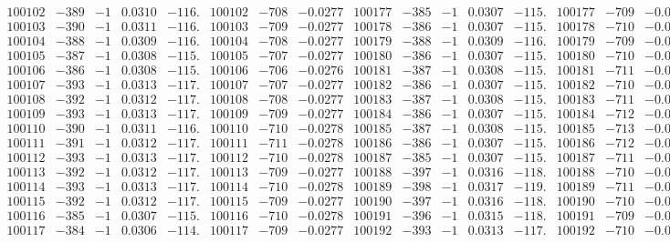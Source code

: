 \documentclass[11pt,reqno,a4letter]{article}
\numberwithin{figure}{section}
\numberwithin{table}{section}
\theoremstyle{plain}
\numberwithin{theorem}{section}
\theoremstyle{definition}
\begin{document}
\begin{table}[ht!]
\begin{equation*}
{\begin{array}{ccccc|ccc||ccccc|ccc}
100102 & -389 & -1 & 0.0310 & -116. & 100102 & -708 & -0.0277 & 100177 & -385 & -1 & 0.0307 & -115. & 100177 & -709 & -0.0277  \\
100103 & -390 & -1 & 0.0311 & -116. & 100103 & -709 & -0.0277 & 100178 & -386 & -1 & 0.0307 & -115. & 100178 & -710 & -0.0278  \\
100104 & -388 & -1 & 0.0309 & -116. & 100104 & -708 & -0.0277 & 100179 & -388 & -1 & 0.0309 & -116. & 100179 & -709 & -0.0277  \\
100105 & -387 & -1 & 0.0308 & -115. & 100105 & -707 & -0.0277 & 100180 & -386 & -1 & 0.0307 & -115. & 100180 & -710 & -0.0278  \\
100106 & -386 & -1 & 0.0308 & -115. & 100106 & -706 & -0.0276 & 100181 & -387 & -1 & 0.0308 & -115. & 100181 & -711 & -0.0278  \\
100107 & -393 & -1 & 0.0313 & -117. & 100107 & -707 & -0.0277 & 100182 & -386 & -1 & 0.0307 & -115. & 100182 & -710 & -0.0278  \\
100108 & -392 & -1 & 0.0312 & -117. & 100108 & -708 & -0.0277 & 100183 & -387 & -1 & 0.0308 & -115. & 100183 & -711 & -0.0278  \\
100109 & -393 & -1 & 0.0313 & -117. & 100109 & -709 & -0.0277 & 100184 & -386 & -1 & 0.0307 & -115. & 100184 & -712 & -0.0278  \\
100110 & -390 & -1 & 0.0311 & -116. & 100110 & -710 & -0.0278 & 100185 & -387 & -1 & 0.0308 & -115. & 100185 & -713 & -0.0279  \\
100111 & -391 & -1 & 0.0312 & -117. & 100111 & -711 & -0.0278 & 100186 & -386 & -1 & 0.0307 & -115. & 100186 & -712 & -0.0278  \\
100112 & -393 & -1 & 0.0313 & -117. & 100112 & -710 & -0.0278 & 100187 & -385 & -1 & 0.0307 & -115. & 100187 & -711 & -0.0278  \\
100113 & -392 & -1 & 0.0312 & -117. & 100113 & -709 & -0.0277 & 100188 & -397 & -1 & 0.0316 & -118. & 100188 & -710 & -0.0278  \\
100114 & -393 & -1 & 0.0313 & -117. & 100114 & -710 & -0.0278 & 100189 & -398 & -1 & 0.0317 & -119. & 100189 & -711 & -0.0278  \\
100115 & -392 & -1 & 0.0312 & -117. & 100115 & -709 & -0.0277 & 100190 & -397 & -1 & 0.0316 & -118. & 100190 & -710 & -0.0278  \\
100116 & -385 & -1 & 0.0307 & -115. & 100116 & -710 & -0.0278 & 100191 & -396 & -1 & 0.0315 & -118. & 100191 & -709 & -0.0277  \\
100117 & -384 & -1 & 0.0306 & -114. & 100117 & -709 & -0.0277 & 100192 & -393 & -1 & 0.0313 & -117. & 100192 & -710 & -0.0278  \\

\end{array}}
\end{equation*}
\end{table}
\end{document}
